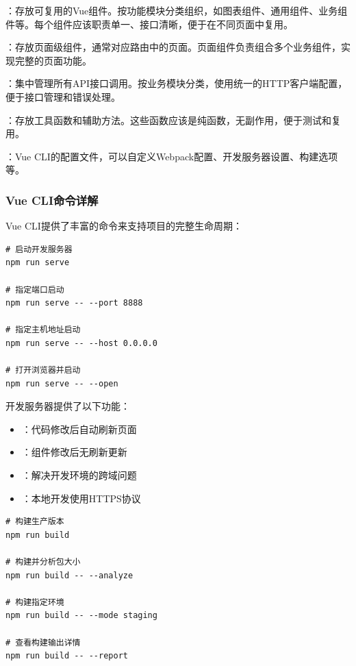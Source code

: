 
：存放可复用的Vue组件。按功能模块分类组织，如图表组件、通用组件、业务组件等。每个组件应该职责单一、接口清晰，便于在不同页面中复用。

：存放页面级组件，通常对应路由中的页面。页面组件负责组合多个业务组件，实现完整的页面功能。

：集中管理所有API接口调用。按业务模块分类，使用统一的HTTP客户端配置，便于接口管理和错误处理。

：存放工具函数和辅助方法。这些函数应该是纯函数，无副作用，便于测试和复用。

：Vue CLI的配置文件，可以自定义Webpack配置、开发服务器设置、构建选项等。

\hypertarget{vue-cliux547dux4ee4ux8be6ux89e3}{%
\subsubsection{Vue CLI命令详解}\label{vue-cliux547dux4ee4ux8be6ux89e3}}

Vue CLI提供了丰富的命令来支持项目的完整生命周期：


\begin{lstlisting}[style=terminal]
# 启动开发服务器
npm run serve

# 指定端口启动
npm run serve -- --port 8888

# 指定主机地址启动
npm run serve -- --host 0.0.0.0

# 打开浏览器并启动
npm run serve -- --open
\end{lstlisting}

开发服务器提供了以下功能：

\begin{itemize}
\tightlist
\item
  ：代码修改后自动刷新页面
\item
  ：组件修改后无刷新更新
\item
  ：解决开发环境的跨域问题
\item
  ：本地开发使用HTTPS协议
\end{itemize}


\begin{lstlisting}[style=terminal]
# 构建生产版本
npm run build

# 构建并分析包大小
npm run build -- --analyze

# 构建指定环境
npm run build -- --mode staging

# 查看构建输出详情
npm run build -- --report
\end{lstlisting}

